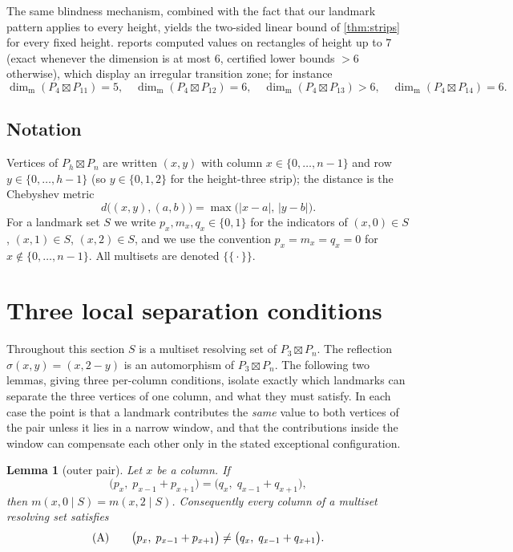 \documentclass[11pt]{amsart}
\newtheorem{lemma}[lemma]{Lemma}
\theoremstyle{remark}
\newcommand{\mdim}{\operatorname{dim}_{\mathrm m}}
\newcommand{\dist}{d}
\newcommand{\ms}[1]{\mathopen{\{\!\{}#1\mathclose{\}\!\}}}
\begin{document}
The same blindness mechanism, combined with the fact that our landmark pattern applies to every height, yields the two-sided linear bound of \cref{thm:strips} for every fixed height.   reports computed values on rectangles of height up to $7$ (exact whenever the dimension is at most $6$, certified lower bounds ${>}6$ otherwise), which display an irregular transition zone; for instance
\[
 \mdim(P_4\boxtimes P_{11})=5,\quad
 \mdim(P_4\boxtimes P_{12})=6,\quad
 \mdim(P_4\boxtimes P_{13})>6,\quad
 \mdim(P_4\boxtimes P_{14})=6 .
\]

\subsection*{Notation}
Vertices of $P_h\boxtimes P_n$ are written $(x,y)$ with column $x\in\{0,\dots,n-1\}$ and row $y\in\{0,\dots,h-1\}$ (so $y\in\{0,1,2\}$ for the height-three strip); the distance is the Chebyshev metric
\[
 \dist\big((x,y),(a,b)\big)=\max\big(|x-a|,\,|y-b|\big).
\]
For a landmark set $S$ we write $p_x,m_x,q_x\in\{0,1\}$ for the indicators of $(x,0)\in S$, $(x,1)\in S$, $(x,2)\in S$, and we use the convention $p_x=m_x=q_x=0$ for $x\notin\{0,\dots,n-1\}$.  All multisets are denoted $\ms{\cdot}$.

\section{Three local separation conditions}\label{sec:local}

Throughout this section $S$ is a multiset resolving set of $P_3\boxtimes P_n$.  The reflection $\sigma(x,y)=(x,2-y)$ is an automorphism of $P_3\boxtimes P_n$.  The following two lemmas, giving three per-column conditions, isolate exactly which landmarks can separate the three vertices of one column, and what they must satisfy.  In each case the point is that a landmark contributes the \emph{same} value to both vertices of the pair unless it lies in a narrow window, and that the contributions inside the window can compensate each other only in the stated exceptional configuration.

\begin{lemma}[outer pair]\label{lem:A}
Let $x$ be a column.  If
\[
 \big(p_x,\;p_{x-1}+p_{x+1}\big)=\big(q_x,\;q_{x-1}+q_{x+1}\big),
\]
then $m(x,0\mid S)=m(x,2\mid S)$.  Consequently every column of a multiset resolving set satisfies
\[
 \textup{(A)}\qquad \big(p_x,\;p_{x-1}+p_{x+1}\big)\ne\big(q_x,\;q_{x-1}+q_{x+1}\big).
\]
\end{lemma}
\end{document}
